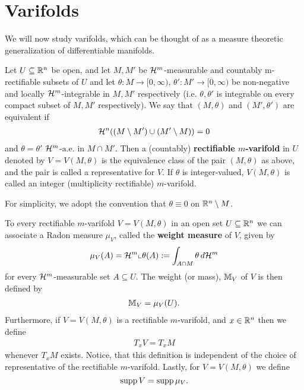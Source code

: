 
\chapter{Varifolds}
We will now study varifolds, which can be thought of as a measure theoretic generalization of differentiable manifolds.

\begin{definition}
Let $U\subseteq \mathbb{R}^n$ be open, and let $M,M'$ be $\mathcal{H}^{m}$-measurable and countably m-rectifiable subsets of $U$ and let $\theta:M \to [0, \infty)$, $\theta':M' \to [0,\infty)$ be non-negative and locally $\mathcal{H}^{m}$-integrable in $M,M'$ respectively (i.e. $\theta, \theta'$ is integrable on every compact subset of $M,M'$ respectively). We say that $(M, \theta)$ and $(M', \theta')$ are equivalent if
\begin{align*}
	\mathcal{H}^{n}((M \setminus M') \cup (M' \setminus M))=0
\end{align*}
and $\theta = \theta'$ $\mathcal{H}^{m}$-a.e. in $M \cap M'$. Then a (countably) \textbf{rectifiable $m$-varifold} in $U$ denoted by $V=V(M, \theta)$ is the equivalence class of the pair $(M, \theta)$ as above, and the pair is called a representative for $V$. If $\theta$ is integer-valued, $V(M, \theta)$ is called an integer (multiplicity rectifiable) $m$-varifold.
\end{definition}

For simplicity, we adopt the convention that $\theta \equiv 0$ on $\mathbb{R}^{n} \setminus M$.

To every rectifiable $m$-varifold $V=V(M, \theta)$ in an open set $U \subseteq \mathbb{R}^n$ we can associate a Radon measure $\mu_{V}$, called the \textbf{weight measure} of $V$, given by
\begin{align*}
	\mu_{V}(A) = \mathcal{H}^{m}\llcorner \theta(A) := \int_{A \cap M} \theta \, d\mathcal{H}^{m}
\end{align*}
for every $\mathcal{H}^{m}$-measurable set $A \subseteq U$. The weight (or mass), $\mathbb{M}_{V}$ of $V$ is then defined by
\begin{align*}
	\mathbb{M}_{V}=\mu_{V}(U).
\end{align*}
Furthermore, if $V=V(M, \theta)$ is a rectifiable $m$-varifold, and $x \in \mathbb{R}^{n}$ then we define
\begin{align*}
	T_{x}V=T_{x}M
\end{align*}
whenever $T_{x}M$ exists. Notice, that this definition is independent of the choice of representative of the rectifiable $m$-varifold. Lastly, for $V=V(M, \theta)$ we define
\[
    \operatorname{supp} V = \operatorname{supp} \mu_V.
\]


